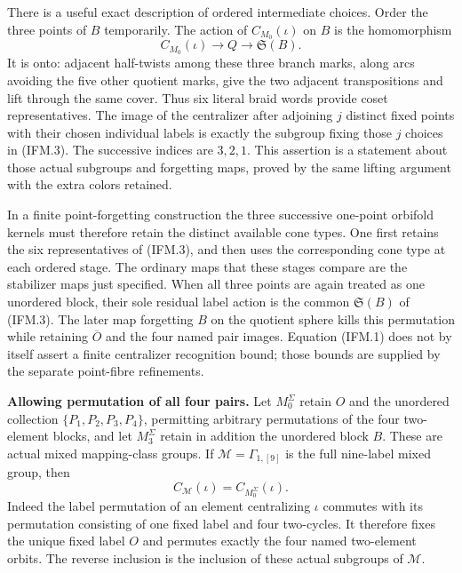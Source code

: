 There is a useful exact description of ordered
intermediate choices.  Order the three points of
$B$ temporarily.  The action of $C_{M_0}(\iota)$
on $B$ is the homomorphism
\[
 C_{M_0}(\iota)\longrightarrow Q
                  \longrightarrow\mathfrak S(B).
 \tag{IFM.3}
\]
It is onto: adjacent half-twists among these
three branch marks, along arcs avoiding the five
other quotient marks, give the two adjacent
transpositions and lift through the same cover.
Thus six literal braid words provide coset
representatives.  The image of the centralizer
after adjoining $j$ distinct fixed points with
their chosen individual labels is exactly the
subgroup fixing those $j$ choices in (IFM.3).
The successive indices are $3,2,1$.
This assertion is a statement about those actual
subgroups and forgetting maps, proved by the same
lifting argument with the extra colors retained.

In a finite point-forgetting construction the
three successive one-point orbifold kernels must
therefore retain the distinct available cone
types.  One first retains the six representatives
of (IFM.3), and then uses the corresponding cone
type at each ordered stage.  The ordinary maps
that these stages compare are the stabilizer maps
just specified.  When all three points are again
treated as one unordered block, their sole
residual label action is the common
$\mathfrak S(B)$ of (IFM.3).  The later map
forgetting $B$ on the quotient sphere kills this
permutation while retaining $\overline O$ and
the four named pair images.  Equation (IFM.1)
does not by itself assert a finite centralizer
recognition bound; those bounds are supplied
by the separate point-fibre refinements.

\par\medskip\noindent\textbf{Allowing permutation of all four pairs.}
Let $M_0^{\Sigma}$ retain $O$ and the unordered collection
$\{P_1,P_2,P_3,P_4\}$, permitting arbitrary permutations of the four
two-element blocks, and let $M_3^{\Sigma}$ retain in addition the
unordered block $B$.  These are actual mixed mapping-class groups.
If $\mathcal M=\Gamma_{1,[9]}$ is the full nine-label mixed group,
then
\[
 C_{\mathcal M}(\iota)=C_{M_0^{\Sigma}}(\iota).
 \tag{IFM.4}
\]
Indeed the label permutation of an element centralizing $\iota$
commutes with its permutation consisting of one fixed label and four
two-cycles.  It therefore fixes the unique fixed label $O$ and
permutes exactly the four named two-element orbits.  The reverse
inclusion is the inclusion of these actual subgroups of $\mathcal M$.

